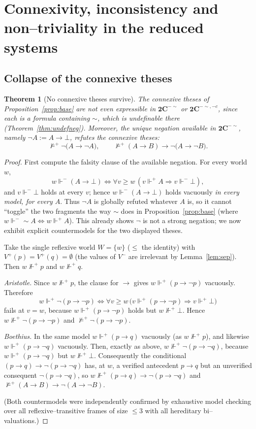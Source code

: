 \documentclass{amsart}
\theoremstyle{plain}
\newtheorem{theorem}{Theorem}
\theoremstyle{definition}
\newcommand{\To}{\rightarrow}
\newcommand{\Ci}{\mathbf{2C}^{-{\sim}}}        %
\newcommand{\Cii}{\mathbf{2C}^{-{\sim},-c}}    %
\newcommand{\fp}{\Vdash^{+}}
\newcommand{\fm}{\Vdash^{-}}
\begin{document}
\section{Connexivity, inconsistency and non--triviality in the reduced systems}
\label{sec:conn}

\subsection{Collapse of the connexive theses}

\begin{theorem}[No connexive theses survive]\label{thm:nocon}
The connexive theses of Proposition~\ref{prop:base} are not even expressible in
$\Ci$ or $\Cii$, since each is a formula containing ${\sim}$, which is
undefinable there (Theorem~\ref{thm:undefneg}). Moreover, the unique negation
available in $\Ci$, namely $\neg A:=A\To\bot$, refutes the connexive theses:
\[
\not\models^{+}\neg\bigl(A\To\neg A\bigr),\qquad
\not\models^{+}(A\To B)\To\neg\bigl(A\To\neg B\bigr).
\]
\end{theorem}
\begin{proof}
First compute the falsity clause of the available negation. For every world
$w$,
\[
w\fm(A\To\bot)\iff\forall v\ge w\,(v\fp A\Rightarrow v\fm\bot),
\]
and $v\fm\bot$ holds at every $v$; hence $w\fm(A\To\bot)$ holds vacuously
\emph{in every model, for every $A$}. Thus $\neg A$ is globally refuted whatever
$A$ is, so it cannot ``toggle'' the two fragments the way ${\sim}$ does in
Proposition~\ref{prop:base} (where $w\fm{\sim}A\iff w\fp A$). This already shows
$\neg$ is not a strong negation; we now exhibit explicit countermodels for the
two displayed theses.

Take the single reflexive world $W=\{w\}$ ($\le$ the identity) with
$V^{+}(p)=V^{+}(q)=\emptyset$ (the values of $V^{-}$ are irrelevant by
Lemma~\ref{lem:sep}). Then $w\not\fp p$ and $w\not\fp q$.

\emph{Aristotle.} Since $w\not\fp p$, the clause for $\To$ gives
$w\fp(p\To\neg p)$ vacuously. Therefore
\[
w\fp\neg(p\To\neg p)
\iff\forall v\ge w\,\bigl(v\fp(p\To\neg p)\Rightarrow v\fp\bot\bigr)
\]
fails at $v=w$, because $w\fp(p\To\neg p)$ holds but $w\not\fp\bot$. Hence
$w\not\fp\neg(p\To\neg p)$ and $\not\models^{+}\neg(p\To\neg p)$.

\emph{Boethius.} In the same model $w\fp(p\To q)$ vacuously (as $w\not\fp p$),
and likewise $w\fp(p\To\neg q)$ vacuously. Then, exactly as above,
$w\not\fp\neg(p\To\neg q)$, because $w\fp(p\To\neg q)$ but $w\not\fp\bot$.
Consequently the conditional $(p\To q)\To\neg(p\To\neg q)$ has, at $w$, a
verified antecedent $p\To q$ but an unverified consequent $\neg(p\To\neg q)$, so
$w\not\fp(p\To q)\To\neg(p\To\neg q)$ and
$\not\models^{+}(A\To B)\To\neg(A\To\neg B)$.

(Both countermodels were independently confirmed by exhaustive model checking
over all reflexive--transitive frames of size $\le 3$ with all hereditary
bi--valuations.)
\end{proof}
\end{document}

